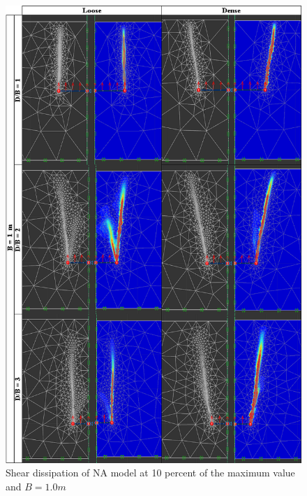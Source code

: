\documentclass[a4paper, nobind]{templates/ociamthesis}
\begin{document}
\begin{figure}[H]
\includegraphics[width=1\linewidth]{myfigureeeeee/C_one_meter} \caption{Shear dissipation of NA model at 10 percent of the maximum value and $B = 1.0m$}\label{fig:unnamed-chunk-27}
\end{figure}
\end{document}
